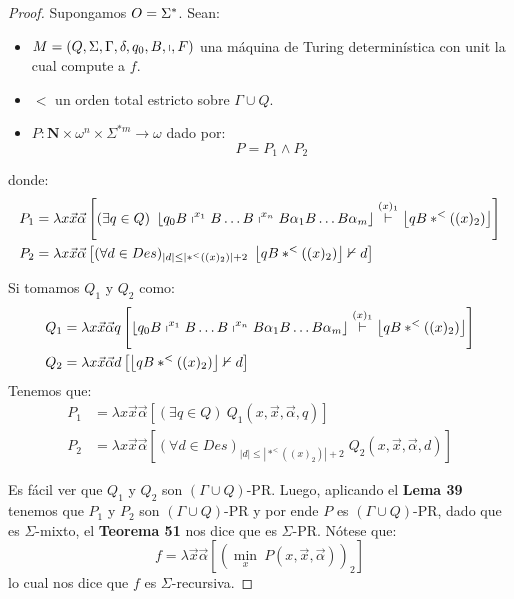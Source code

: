 	\begin{proof}
    Supongamos $O=\Sigma^{\ast}$. Sean:

    \begin{itemize}
      \item $M = \left(Q,\Sigma,\Gamma,\delta,q_{0},B,\shortmid,F\right)$ una máquina de Turing determinística con unit
        la cual compute a $f$.
      \item $<$ un orden total estricto sobre $\Gamma \cup Q$.
      \item $P: \mathbf{N} \times \omega^{n} \times \Sigma^{\ast m} \rightarrow \omega$ dado por:
        \[
          P = P_1 \wedge P_2
        \]
      \end{itemize}
    \PN donde:
    \begin{align*}
      P_1 &= \lambda x\vec{x}\vec{\alpha} \left[(\exists q \in Q) \ \left\lfloor q_{0} B \shortmid^{x_{1}} B \dotsc B
             \shortmid^{x_{n}} B \alpha_{1} B \dotsc B \alpha_{m} \right\rfloor \overset{(x)_{1}}{\vdash} \left\lfloor
             q B \ast^{<}((x)_{2}) \right\rfloor\right] \\
      P_2 &= \lambda x\vec{x}\vec{\alpha} \left[(\forall d \in Des)_{\left\vert d \right\vert \leq \left\vert
             \ast^{<}((x)_{2}) \right\vert + 2} \; \left\lfloor q B \ast^{<}((x)_{2}) \right\rfloor \nvdash d\right]
    \end{align*}

    \PN Si tomamos $Q_1$ y $Q_2$ como:
    \begin{align*}
      Q_1 &= \lambda x\vec{x}\vec{\alpha}q \left[\left\lfloor q_{0} B \shortmid^{x_{1}} B \dotsc B \shortmid^{x_{n}} B
             \alpha_{1} B \dotsc B \alpha_{m} \right\rfloor \overset{(x)_{1}}{\vdash} \left\lfloor q B \ast^{<}((x)_{2})
             \right\rfloor\right] \\
      Q_2 &= \lambda x\vec{x}\vec{\alpha}d \left[\left\lfloor q B \ast^{<}((x)_{2}) \right\rfloor \nvdash d\right]
    \end{align*}
    \PN Tenemos que:
    \begin{align*}
      P_1 &= \lambda x\vec{x}\vec{\alpha} \left[(\exists q \in Q) \ Q_1(x,\vec{x},\vec{\alpha},q)\right] \\
      P_2 &= \lambda x\vec{x}\vec{\alpha} \left[(\forall d \in Des)_{\left\vert d \right\vert \leq \left\vert \ast^{<}
             ((x)_{2}) \right\vert + 2} \; Q_2(x,\vec{x},\vec{\alpha},d)\right]
    \end{align*}

    \PN Es fácil ver que $Q_1$ y $Q_2$ son $(\Gamma \cup Q)$-PR. Luego, aplicando el \textbf{Lema 39} tenemos que $P_1$
    y $P_2$ son $(\Gamma \cup Q)$-PR y por ende $P$ es $(\Gamma \cup Q)$-PR, dado que es $\Sigma $-mixto, el
    \textbf{Teorema 51} nos dice que es $\Sigma $-PR. Nótese que:
    \[
      f = \lambda \vec{x}\vec{\alpha} \left[\left(\min_{x} \ P(x,\vec{x},\vec{\alpha})\right)_{2}\right]
    \]
    \PN lo cual nos dice que $f$ es $\Sigma$-recursiva.
  \end{proof}

